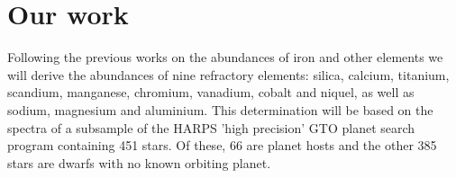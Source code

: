 \documentclass[dvips,12pt,a4paper]{report}
\begin{document}
{%






\section {Our work}


Following the previous works on the abundances of iron and other elements we will derive the abundances of nine refractory elements: silica, calcium, titanium, scandium, manganese, chromium, vanadium, cobalt and niquel, as well as sodium, magnesium and aluminium. This determination will be based on the spectra of a subsample of the HARPS 'high precision' GTO planet search program containing 451 stars. Of these, 66 are planet hosts and the other 385 stars are dwarfs with no known orbiting planet. 

}
\end{document}

